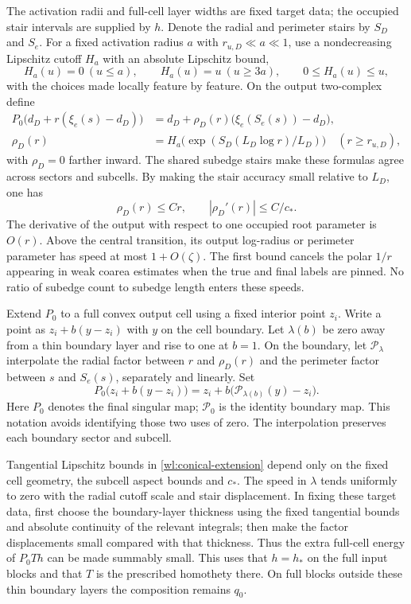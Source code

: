 \documentclass[11pt]{article}
\numberwithin{equation}{section}
\theoremstyle{definition}
\theoremstyle{remark}
\begin{document}
The activation radii and full-cell layer widths are fixed target
data; the occupied stair intervals are supplied by $h$.  Denote the
radial and perimeter stairs by $S_D$ and $S_e$.  For a fixed activation
radius $a$ with $r_{u,D}\ll a\ll1$, use a nondecreasing Lipschitz
cutoff $H_a$ with an absolute Lipschitz bound,
\[
 H_a(u)=0\ (u\leq a),\qquad H_a(u)=u\ (u\geq3a),\qquad
 0\leq H_a(u)\leq u,
\]
with the choices made locally feature by feature.  On the output
two-complex define
\begin{align}
 P_0\bigl(d_D+r(\xi_e(s)-d_D)\bigr)
   &=d_D+\rho_D(r)\bigl(\xi_e(S_e(s))-d_D\bigr),
       \label{wl:target-map}\\
 \rho_D(r)&=H_a\bigl(\exp(S_D(L_D\log r)/L_D)\bigr)
       \quad(r\geq r_{u,D}),\label{wl:radial-stair}
\end{align}
with $\rho_D=0$ farther inward.  The shared subedge stairs make these
formulas agree across sectors and subcells.  By making the stair
accuracy small relative to $L_D$, one has
\begin{equation}\label{wl:target-speeds}
 \rho_D(r)\leq Cr,\qquad |\rho_D'(r)|\leq C/c_*.
\end{equation}
The derivative of the output with respect to one occupied root
parameter is $O(r)$.  Above the central transition, its output
log-radius or perimeter parameter has speed at most $1+O(\zeta)$.
The first bound cancels the polar $1/r$ appearing in weak coarea
estimates when the true and final labels are pinned.  No ratio of
subedge count to subedge length enters these speeds.

Extend $P_0$ to a full convex output cell using a fixed interior point
$z_i$.  Write a point as $z_i+b(y-z_i)$ with $y$ on the cell boundary.
Let $\lambda(b)$ be zero away from a thin boundary layer and rise to
one at $b=1$.  On the boundary, let $\mathcal P_\lambda$ interpolate
the radial factor between $r$ and $\rho_D(r)$ and the perimeter
factor between $s$ and $S_e(s)$, separately and linearly.  Set
\begin{equation}\label{wl:conical-extension}
 P_0\bigl(z_i+b(y-z_i)\bigr)
   =z_i+b\bigl(\mathcal P_{\lambda(b)}(y)-z_i\bigr).
\end{equation}
Here $P_0$ denotes the final singular map; $\mathcal P_0$ is the
identity boundary map.  This notation avoids identifying those two
uses of zero.  The interpolation preserves each boundary sector and
subcell.

Tangential Lipschitz bounds in \eqref{wl:conical-extension} depend only
on the fixed cell geometry, the subcell aspect bounds and $c_*$.  The
speed in $\lambda$ tends uniformly to zero with the radial cutoff
scale and stair displacement.  In fixing these target data, first choose the boundary-layer
thickness using the fixed tangential bounds and absolute continuity
of the relevant integrals; then make the factor displacements small
compared with that thickness.  Thus the extra full-cell energy of
$P_0Th$ can be made summably small.  This uses that $h=h_*$ on the
full input blocks and that $T$ is the prescribed homothety there.
On full blocks outside these thin boundary layers the composition
remains $q_0$.
\end{document}
